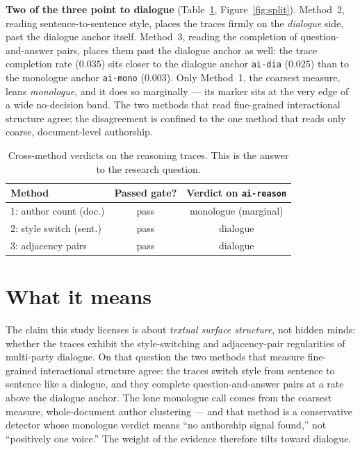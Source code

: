 \documentclass[10pt,twocolumn]{article}
\begin{document}
\textbf{Two of the three point to dialogue} (Table~\ref{tab:verdict}, Figure~\ref{fig:split}).
Method~2, reading sentence-to-sentence style, places the traces firmly on the \emph{dialogue} side,
past the dialogue anchor itself. Method~3, reading the completion of question-and-answer pairs,
places them past the dialogue anchor as well: the trace completion rate ($0.035$) sits closer to
the dialogue anchor \texttt{ai-dia} ($0.025$) than to the monologue anchor \texttt{ai-mono}
($0.003$). Only Method~1, the coarsest measure, leans \emph{monologue}, and it does so marginally
--- its marker sits at the very edge of a wide no-decision band. The two methods that read
fine-grained interactional structure agree; the disagreement is confined to the one method that
reads only coarse, document-level authorship.

\begin{table}[t]
\centering
\small
\caption{Cross-method verdicts on the reasoning traces. This is the answer to the research
question.}
\label{tab:verdict}
\begin{tabular}{@{}lcc@{}}
\toprule
Method & Passed gate? & Verdict on \texttt{ai-reason} \\
\midrule
1: author count (doc.) & pass & \textcolor{mono}{monologue (marginal)} \\
2: style switch (sent.) & pass & \textcolor{dia}{dialogue} \\
3: adjacency pairs & pass & \textcolor{dia}{dialogue} \\
\bottomrule
\end{tabular}
\end{table}

\section{What it means}
The claim this study licenses is about \emph{textual surface structure}, not hidden minds: whether
the traces exhibit the style-switching and adjacency-pair regularities of multi-party dialogue. On
that question the two methods that measure fine-grained interactional structure agree: the traces
switch style from sentence to sentence like a dialogue, and they complete question-and-answer pairs
at a rate above the dialogue anchor. The lone monologue call comes from the coarsest measure,
whole-document author clustering --- and that method is a conservative detector whose monologue
verdict means ``no authorship signal found,'' not ``positively one voice.'' The weight of the
evidence therefore tilts toward dialogue.
\end{document}
